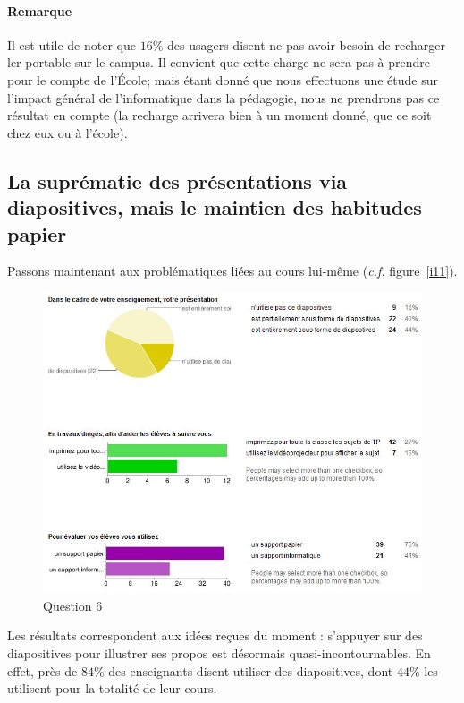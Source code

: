 \documentclass[a4paper,11pt,french]{article}
\begin{document}
\paragraph{Remarque}
Il est utile de noter que $16\%$ des usagers disent ne pas avoir besoin de recharger ler portable sur le campus. Il convient que cette charge ne sera pas à prendre pour le compte de l'École; mais étant donné que nous effectuons une étude sur l'impact général de l'informatique dans la pédagogie, nous ne prendrons pas ce résultat en compte (la recharge arrivera bien à un moment donné, que ce soit chez eux ou à l'école).\\


\subsection[Quelles suprématies ?]{La suprématie des présentations via diapositives, mais le maintien des habitudes papier}

Passons maintenant aux problématiques liées au cours lui-même (\textit{c.f.} figure~\vref{i11}).\\

\begin{figure}[h!]
\includegraphics[width=\textwidth]{i11.JPG}
\caption{Question 6}
\label{i11}
\end{figure}

Les résultats correspondent aux idées reçues du moment : s'appuyer sur des diapositives pour illustrer ses propos est désormais quasi-incontournables. En effet, près de $84\%$ des enseignants disent utiliser des diapositives, dont $44\%$ les utilisent pour la totalité de leur cours.\\
\end{document}
